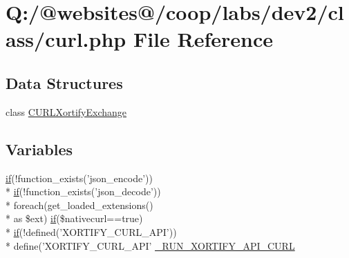 \hypertarget{curl_8php}{\section{Q\-:/@websites@/coop/labs/dev2/class/curl.php File Reference}
\label{curl_8php}
}
\subsection*{Data Structures}
\begin{DoxyCompactItemize}
\item 
class \hyperlink{class_c_u_r_l_xortify_exchange}{C\-U\-R\-L\-Xortify\-Exchange}
\end{DoxyCompactItemize}
\subsection*{Variables}
\begin{DoxyCompactItemize}
\item 
\hyperlink{index_8php_ae2ccdf355624402b65fc2226f2a661cd}{if}(!function\-\_\-exists('json\-\_\-encode')) \\*
\hyperlink{index_8php_ae2ccdf355624402b65fc2226f2a661cd}{if}(!function\-\_\-exists('json\-\_\-decode')) \\*
foreach(get\-\_\-loaded\-\_\-extensions() \\*
as \$ext) \hyperlink{index_8php_ae2ccdf355624402b65fc2226f2a661cd}{if}(\$nativecurl==true) \\*
\hyperlink{index_8php_ae2ccdf355624402b65fc2226f2a661cd}{if}(!defined('X\-O\-R\-T\-I\-F\-Y\-\_\-\-C\-U\-R\-L\-\_\-\-A\-P\-I')) \\*
define('X\-O\-R\-T\-I\-F\-Y\-\_\-\-C\-U\-R\-L\-\_\-\-A\-P\-I' \hyperlink{curl_8php_a1a0cd15bcec96ef5aa5c4451f95062bb}{\-\_\-\-R\-U\-N\-\_\-\-X\-O\-R\-T\-I\-F\-Y\-\_\-\-A\-P\-I\-\_\-\-C\-U\-R\-L}
\end{DoxyCompactItemize}


